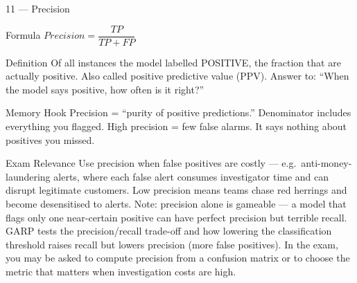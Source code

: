 \documentclass[aspectratio=169,8pt]{beamer}
\begin{document}
	\begin{frame}{11 --- Precision}
		\begin{block}{Formula}
			$Precision = \dfrac{TP}{TP + FP}$
		\end{block}
		\begin{block}{Definition}
			Of all instances the model labelled POSITIVE, the fraction that are actually positive. Also called positive predictive value (PPV). Answer to: ``When the model says positive, how often is it right?''
		\end{block}
		\begin{block}{Memory Hook}
			Precision = ``purity of positive predictions.'' Denominator includes everything you flagged. High precision = few false alarms. It says nothing about positives you missed.
		\end{block}
		\begin{block}{Exam Relevance}
			Use precision when false positives are costly --- e.g.\ anti-money-laundering alerts, where each false alert consumes investigator time and can disrupt legitimate customers. Low precision means teams chase red herrings and become desensitised to alerts. Note: precision alone is gameable --- a model that flags only one near-certain positive can have perfect precision but terrible recall. GARP tests the precision/recall trade-off and how lowering the classification threshold raises recall but lowers precision (more false positives). In the exam, you may be asked to compute precision from a confusion matrix or to choose the metric that matters when investigation costs are high.
		\end{block}
	\end{frame}
	
\end{document}
